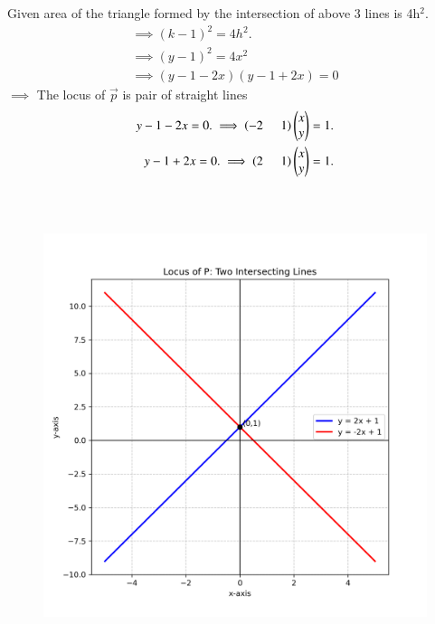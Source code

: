 \documentclass[journal]{IEEEtran}
\begin{document}
Given area of the triangle formed by the intersection of above 3 lines is 4h$^2$.
\begin{align}
    \implies (k-1)^2= 4h^2.\\
    \implies (y-1)^2=4x^2\\
    \implies(y-1-2x)(y-1+2x)=0
    \end{align}
   $\implies$ The locus of $\vec{p}$ is pair of  straight lines
   \begin{align}
     y-1-2x=0. \implies  \left(-2\hspace{0.5cm}1\right)\begin{pmatrix}x\\y\end{pmatrix}=1.\\
     y-1+2x=0. \implies  \left(2\hspace{0.5cm}1\right)\begin{pmatrix}x\\y\end{pmatrix}=1.
   \end{align}
   \\ \\ 
   \begin{figure}[H]
    \centering
    \includegraphics[width=0.96\columnwidth]{figs/01.png}
    \label{fig-1}
\end{figure}
\end{document}
